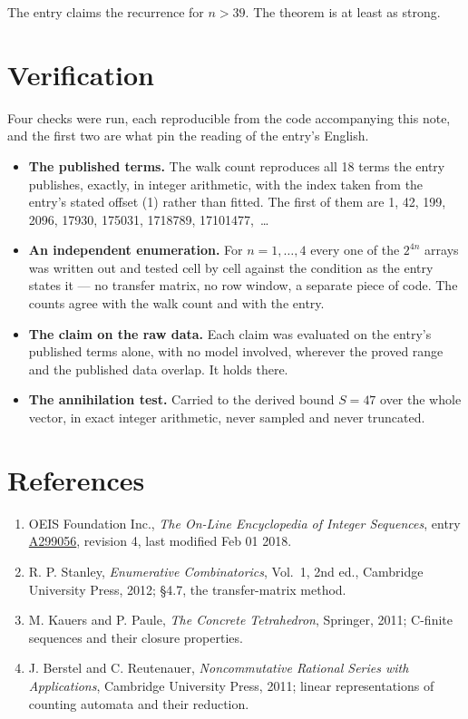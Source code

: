 \documentclass[11pt]{article}
\theoremstyle{definition}
\begin{document}
The entry claims the recurrence for $n > 39$. The theorem is at least as strong.

\section{Verification}

Four checks were run, each reproducible from the code accompanying this note, and the first two are what pin the reading of the entry's English.

\begin{itemize}

\item {\bfseries The published terms.} The walk count reproduces all 18 terms the entry publishes, exactly, in integer arithmetic, with the index taken from the entry's stated offset (1) rather than fitted. The first of them are 1, 42, 199, 2096, 17930, 175031, 1718789, 17101477,~\dots

\item {\bfseries An independent enumeration.} For $n = 1,\dots,4$ every one of the $2^{4n}$ arrays was written out and tested cell by cell against the condition as the entry states it --- no transfer matrix, no row window, a separate piece of code. The counts agree with the walk count and with the entry.

\item {\bfseries The claim on the raw data.} Each claim was evaluated on the entry's published terms alone, with no model involved, wherever the proved range and the published data overlap. It holds there.

\item {\bfseries The annihilation test.} Carried to the derived bound $S = 47$ over the whole vector, in exact integer arithmetic, never sampled and never truncated.

\end{itemize}

\section{References}

\begin{enumerate}

\item OEIS Foundation Inc., \emph{The On-Line Encyclopedia of Integer Sequences}, entry \href{https://oeis.org/A299056}{A299056}, revision 4, last modified Feb 01 2018.

\item R. P. Stanley, \emph{Enumerative Combinatorics}, Vol.~1, 2nd ed., Cambridge University Press, 2012; \S4.7, the transfer-matrix method.

\item M. Kauers and P. Paule, \emph{The Concrete Tetrahedron}, Springer, 2011; C-finite sequences and their closure properties.

\item J. Berstel and C. Reutenauer, \emph{Noncommutative Rational Series with Applications}, Cambridge University Press, 2011; linear representations of counting automata and their reduction.

\end{enumerate}
\end{document}
